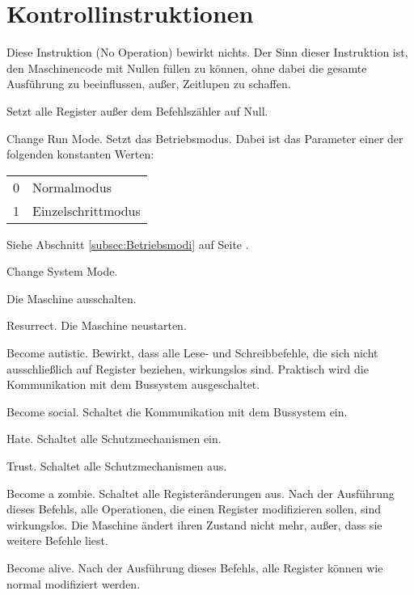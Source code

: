 \section{Kontrollinstruktionen}

Diese Instruktion (\glqq No Operation\grqq) bewirkt nichts.
Der Sinn dieser Instruktion ist, den Maschinencode mit Nullen füllen zu können,
ohne dabei die gesamte Ausführung zu beeinflussen, außer, Zeitlupen zu schaffen. 


Setzt alle Register außer dem Befehlszähler auf Null.


\glqq Change Run Mode\grqq.
Setzt das \gls{Betriebsmodus}.
Dabei ist das Parameter einer der folgenden konstanten Werten:
\begin{center}
  \begin{tabular}[l]{ll}
    0 & Normalmodus \\
    1 & Einzelschrittmodus \\
  \end{tabular}
\end{center}
Siehe Abschnitt \ref{subsec:Betriebsmodi} auf Seite
\pageref{subsec:Betriebsmodi}.



Change System Mode.



Die Maschine ausschalten.



\glqq Resurrect\grqq.
Die Maschine neustarten.



\glqq Become autistic\grqq.
Bewirkt, dass alle Lese- und Schreibbefehle, die sich nicht ausschließlich auf
Register beziehen, wirkungslos sind. Praktisch wird die Kommunikation mit dem
Bussystem ausgeschaltet.


\glqq Become social\grqq. Schaltet die Kommunikation mit dem Bussystem ein.


\glqq Hate\grqq. Schaltet alle Schutzmechanismen ein.


\glqq Trust\grqq. Schaltet alle Schutzmechanismen aus.


\glqq Become a zombie\grqq.
Schaltet alle Registeränderungen aus. Nach der Ausführung dieses Befehls, alle
Operationen, die einen Register modifizieren sollen, sind wirkungslos.
Die Maschine ändert ihren Zustand nicht mehr, außer, dass sie weitere Befehle
liest.


\glqq Become alive\grqq.
Nach der Ausführung dieses Befehls, alle Register können wie normal modifiziert
werden.


